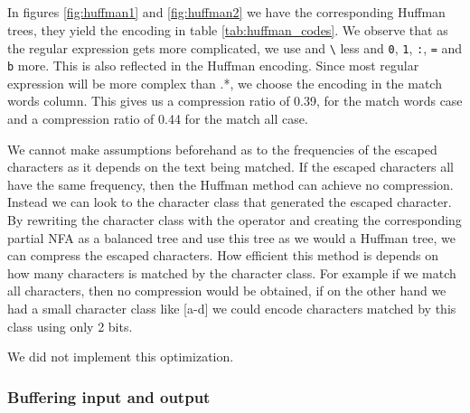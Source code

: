 \subparagraph{}
In figures \vref{fig:huffman1} and \vref{fig:huffman2} we have the
corresponding Huffman trees, they yield the encoding in table
\vref{tab:huffman_codes}. We observe that as the regular expression
gets more complicated, we use \texttt{\textbar} and
\texttt{\textbackslash} less and \texttt{0}, \texttt{1}, \texttt{:},
\texttt{=} and \texttt{b} more. This is also reflected in the Huffman
encoding. Since most regular expression will be more complex than
\textsf{.*}, we choose the encoding in the match words column. This
gives us a compression ratio of 0.39, for the match words case
and a compression ratio of 0.44 for the match all case. 


We cannot make assumptions beforehand as to the frequencies of the
escaped characters as it depends on the text being
matched. If the escaped characters all have the same frequency, then
the Huffman method can achieve no compression. Instead we can look to
the character class that generated the escaped character. By rewriting
the character class with the \textsf{\textbar} operator and creating
the corresponding partial NFA as a balanced tree and use this tree as
we would a Huffman tree, we can compress the escaped characters. How
efficient this method is depends on how many characters is matched by
the character class. For example if we match all characters, then no
compression would be obtained, if on the other hand we had a small
character class like \textsf{[a-d]} we could encode characters matched
by this class using only 2 bits. 

We did not implement this optimization.

\subsubsection{Buffering input and output}


